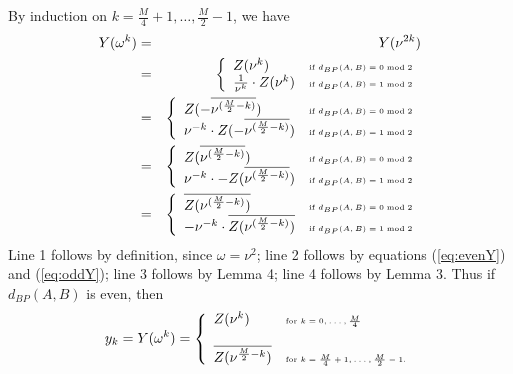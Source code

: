 By induction on $k=\frac{M}{4}+1,\ldots,\frac{M}{2}-1$, we have
\begin{eqnarray*}
Y(\omega^k)&=& Y(\nu^{2k})  \nonumber \\
&=& \left\{ \begin{array}{ll}
Z(\nu^{k}) &\mbox{\tiny if
$d_{BP}(A,B) = 0 \bmod 2$}\\
\frac{1}{\nu^{k}} \cdot Z(\nu^{k})
&\mbox{\tiny if
$d_{BP}(A,B) = 1 \bmod 2$}\\
\end{array} \right. \nonumber\\
&=& \left\{ \begin{array}{ll}
Z(- \overline{\nu^{(\frac{M}{2}-k)}}) &\mbox{\tiny if
$d_{BP}(A,B) = 0 \bmod 2$}\\
\nu^{-k} \cdot
Z(-\overline{\nu^{(\frac{M}{2}-k)}})
&\mbox{\tiny if
$d_{BP}(A,B) = 1 \bmod 2$}\\
\end{array} \right. \nonumber\\
&=& \left\{ \begin{array}{ll}
Z(\overline{\nu^{(\frac{M}{2}-k)}}) &\mbox{\tiny if
$d_{BP}(A,B) = 0 \bmod 2$}\\
\nu^{-k} \cdot
-Z(\overline{\nu^{(\frac{M}{2}-k)}})
&\mbox{\tiny if
$d_{BP}(A,B) = 1 \bmod 2$}\\
\end{array} \right.  \nonumber\\
&=& \left\{ \begin{array}{ll}
\overline{Z(\nu^{(\frac{M}{2}-k)})} &\mbox{\tiny if
$d_{BP}(A,B) = 0 \bmod 2$}\\
-\nu^{-k} \cdot
\overline{Z(\nu^{(\frac{M}{2}-k)})}
&\mbox{\tiny if
$d_{BP}(A,B) = 1 \bmod 2$}\\
\end{array} \right.  \nonumber\\
\end{eqnarray*}
Line 1 follows by definition, since $\omega=\nu^2$;
line 2 follows by equations (\ref{eq:evenY}) and
(\ref{eq:oddY});
line 3 follows by Lemma 4;
line 4 follows by Lemma 3.
Thus if $d_{BP}(A,B)$ is even, then
\begin{eqnarray}
\label{eq:trickyRootsOfUnity1}
y_k = Y(\omega^k) = \left\{
\begin{array}{ll}
Z(\nu^k) &\mbox{\tiny for $k=0,\ldots,\frac{M}{4}$}\\
\quad & \quad\\
\overline{Z(\nu^{\frac{M}{2}-k})} &\mbox{\tiny for $k=\frac{M}{4}+1,\ldots,\frac{M}{2}-1$.}\\
\end{array} \right.
\end{eqnarray}
